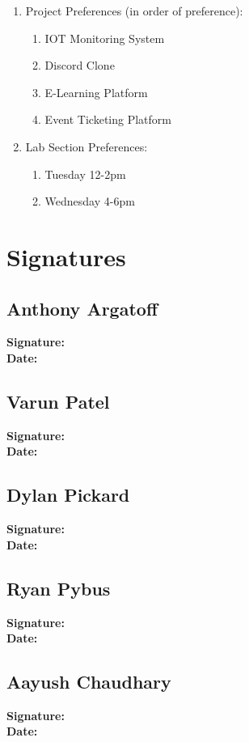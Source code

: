 \documentclass{article}
\begin{document}
\begin{enumerate}
    \item Project Preferences (in order of preference):
        \begin{enumerate}
            \item IOT Monitoring System
            \item Discord Clone
            \item E-Learning Platform
            \item Event Ticketing Platform
        \end{enumerate}
    \item Lab Section Preferences:
        \begin{enumerate}
            \item Tuesday 12-2pm
            \item Wednesday 4-6pm
        \end{enumerate}
\end{enumerate}

\pagebreak

\section*{Signatures}

\subsection*{Anthony Argatoff}
\textbf{Signature:} \\[10pt]
\textbf{Date:}

\subsection*{Varun Patel}
\textbf{Signature:} \\[10pt]
\textbf{Date:}

\subsection*{Dylan Pickard}
\textbf{Signature:} \\[10pt]
\textbf{Date:}

\subsection*{Ryan Pybus}
\textbf{Signature:} \\[10pt]
\textbf{Date:}

\subsection*{Aayush Chaudhary}
\textbf{Signature:} \\[10pt]
\textbf{Date:}
\end{document}
